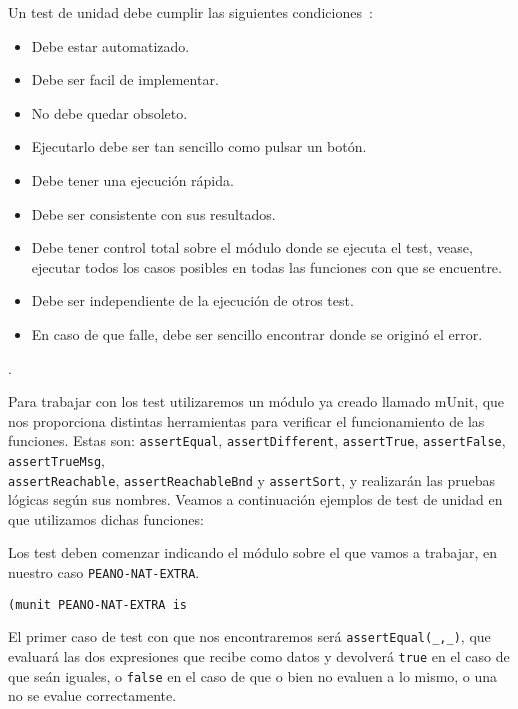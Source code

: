 Un test de unidad debe cumplir las siguientes condiciones~\cite{unitTests}: \par

\begin{itemize}
\item Debe estar automatizado.
\item Debe ser facil de implementar.
\item No debe quedar obsoleto.
\item Ejecutarlo debe ser tan sencillo como pulsar un botón.
\item Debe tener una ejecución rápida.
\item Debe ser consistente con sus resultados. 
\item Debe tener control total sobre el módulo donde se ejecuta el test, vease, ejecutar todos los casos posibles en todas las funciones con que se encuentre.
\item Debe ser independiente de la ejecución de otros test.
\item En caso de que falle, debe ser sencillo encontrar donde se originó el error.
\end{itemize}.

Para trabajar con los test utilizaremos un módulo ya creado llamado mUnit, que nos proporciona distintas herramientas para verificar el funcionamiento de las funciones. Estas son: \verb"assertEqual", \verb"assertDifferent", \verb"assertTrue", \verb"assertFalse", \verb"assertTrueMsg",\\ \verb"assertReachable", \verb"assertReachableBnd" y \verb"assertSort", y realizarán las pruebas lógicas según sus nombres. Veamos a continuación ejemplos de test de unidad en que utilizamos dichas funciones:\par

Los test deben comenzar indicando el módulo sobre el que vamos a trabajar, en nuestro caso \texttt{PEANO-NAT-EXTRA}. \par

{\codesize
\begin{verbatim}
(munit PEANO-NAT-EXTRA is
\end{verbatim}
}

El primer caso de test con que nos encontraremos será \verb"assertEqual(_,_)", que evaluará las dos expresiones que recibe como datos y devolverá \texttt{true} en el caso de que seán iguales, o \texttt{false} en el caso de que o bien no evaluen a lo mismo, o una no se evalue correctamente. \par

